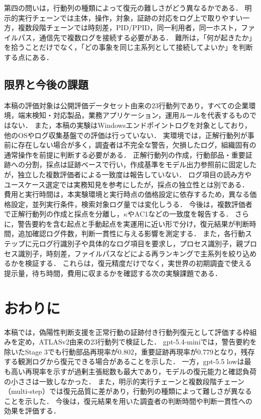 \documentclass[a4paper,twocolumn,10pt]{article}
\newcommand{\code}[1]{{\small\ttfamily #1}}
\begin{document}
第四の問いは，行動列の種類によって復元の難しさがどう異なるかである．
明示的実行チェーンでは主体，操作，対象，証跡の対応をログ上で取りやすい一方，複数段階チェーンでは時刻差，\code{PID/PPID}，同一利用者，同一ホスト，ファイルパス，通信先で複数ログを接続する必要がある．
難所は，「何が起きたか」を拾うことだけでなく，「どの事象を同じ主系列として接続してよいか」を判断する点にある．

\subsection{限界と今後の課題}

本稿の評価対象は公開評価データセット由来の\(23\)行動列であり，すべての企業環境，端末検知・対応製品，業務アプリケーション，運用ルールを代表するものではない．
また，本稿の実験はWindowsエンドポイントログを対象としており，他のOSやログ収集基盤での評価は行っていない．
実環境では，正解行動列が事前に存在しない場合が多く，調査者は不完全な警告，欠損したログ，組織固有の通常操作を前提に判断する必要がある．
正解行動列の作成，行動部品・重要証跡への分割，採点は証跡ベースで行い，作成基準をモデル出力参照前に固定したが，独立した複数評価者による一致度は報告していない．
ログ項目の読み方やユースケース選定では実務知見を参考にしたが，採点の独立性とは別である．
費用と実行時間は，本実験環境と実行時点の価格設定に依存するため，異なる価格設定，並列実行条件，検索対象ログ量では変化しうる．
今後は，複数評価者で正解行動列の作成と採点を分離し，\(\kappa\)やAC1などの一致度を報告する．
さらに，警告要約を含む起点と手動起点を実運用に近い形で分け，復元結果が判断時間，追加確認ログ件数，判断一貫性に与える影響を測定する．
また，各行動ステップに元ログ行識別子や具体的なログ項目を要求し，プロセス識別子，親プロセス識別子，時刻差，ファイルパスなどによる再ランキングで主系列を絞り込めるかを検証する．
これらは，復元精度だけでなく，実世界の初期調査で使える提示量，待ち時間，費用に収まるかを確認する次の実験課題である．

\section{おわりに}

本稿では，偽陽性判断支援を正常行動の証跡付き行動列復元として評価する枠組みを定め，ATLASv2由来の\(23\)行動列\cite{atlasv2}で検証した．
\code{gpt-5.4-mini}では，警告要約を除いたStage \(3\)でも行動部品再現率が\(0.802\)，重要証跡再現率が\(0.779\)となり，残存する観測ログから復元できる場合があることを示した．
一方，\code{gpt-5.5 low}は最も高い再現率を示すが過剰主張総数も最大であり，モデルの復元能力と確認負荷の小ささは一致しなかった．
また，明示的実行チェーンと複数段階チェーン（\code{multi-step}）では復元品質に差があり，行動列の種類によって難しさが異なることを示した．
今後は，復元結果を用いた調査者の判断時間や判断一貫性への効果を評価する．
\end{document}
